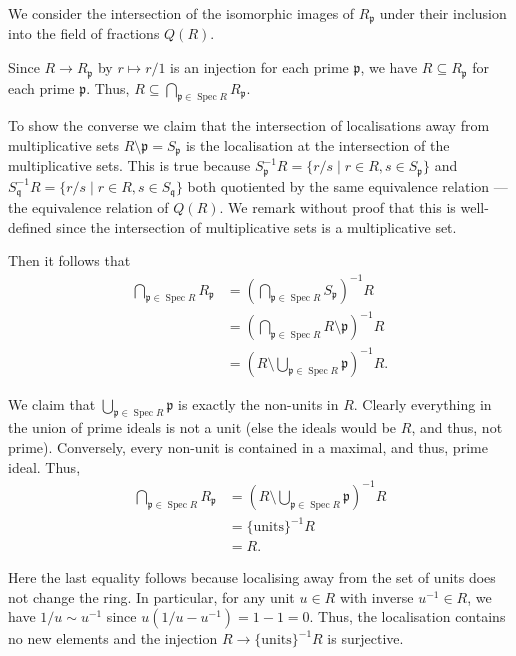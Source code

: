 \documentclass[12 pt, letterpaper]{hmcpset}
\begin{document}
\begin{solution}
	We consider the intersection of the isomorphic images of $R_{\mathfrak{p}}$ under their inclusion into the field of fractions $Q(R)$.

	Since $R \to R_{\mathfrak{p}}$ by $r \mapsto r / 1$ is an injection for each prime $\mathfrak{p}$, we have $R \subseteq R_{\mathfrak{p}}$ for each prime $\mathfrak{p}$. Thus, $R \subseteq \bigcap_{\mathfrak{p} \in \operatorname{Spec} R} R_{\mathfrak{p}}$.

	To show the converse we claim that the intersection of localisations away from multiplicative sets $R \setminus \mathfrak{p} = S_{\mathfrak{p}}$ is the localisation at the intersection of the multiplicative sets. This is true because $S_{\mathfrak{p}}^{-1} R = \{ r / s \mid r \in R, s \in S_{\mathfrak{p}} \}$ and $S_{\mathfrak{q}}^{-1} R = \{ r / s \mid r \in R, s \in S_{\mathfrak{q}} \}$ both quotiented by the same equivalence relation --- the equivalence relation of $Q(R)$. We remark without proof that this is well-defined since the intersection of multiplicative sets is a multiplicative set.

	Then it follows that
	\begin{align*}
		\bigcap_{\mathfrak{p} \in \operatorname{Spec} R} R_{\mathfrak{p}} & = \left ( \bigcap_{\mathfrak{p} \in \operatorname{Spec} R} S_{\mathfrak{p}} \right )^{-1} R \\
										  & = \left ( \bigcap_{\mathfrak{p} \in \operatorname{Spec} R} R \setminus \mathfrak{p} \right )^{-1} R \\
										  & = \left ( R \setminus \bigcup_{\mathfrak{p} \in \operatorname{Spec} R} \mathfrak{p} \right )^{-1} R.
	\end{align*}

	We claim that $\bigcup_{\mathfrak{p} \in \operatorname{Spec} R} \mathfrak{p}$ is exactly the non-units in $R$. Clearly everything in the union of prime ideals is not a unit (else the ideals would be $R$, and thus, not prime). Conversely, every non-unit is contained in a maximal, and thus, prime ideal. Thus,
	\begin{align*}
		\bigcap_{\mathfrak{p} \in \operatorname{Spec} R} R_{\mathfrak{p}} & = \left ( R \setminus \bigcup_{\mathfrak{p} \in \operatorname{Spec} R} \mathfrak{p} \right )^{-1} R \\
										  & = \{ \text{units} \}^{-1} R \\
										  & = R.
	\end{align*}

	Here the last equality follows because localising away from the set of units does not change the ring. In particular, for any unit $u \in R$ with inverse $u^{-1} \in R$, we have $1 / u \sim u^{-1}$ since $u(1 /u - u^{-1}) = 1 - 1 = 0$. Thus, the localisation contains no new elements and the injection $R \to \{ \text{units} \}^{-1} R$ is surjective.
\end{solution}
\end{document}
